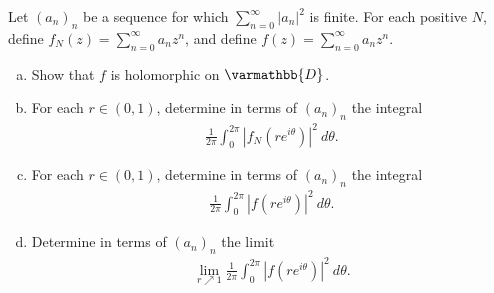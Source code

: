 \documentclass[10pt]{mypackage}
\renewcommand*{\mathbb}[1]{\varmathbb{#1}}
\begin{document}
\RaggedRight
\begin{problem}[Problem 1]
  Let $\left( a_n \right)_n$ be a sequence for which $\sum_{n=0}^{\infty}\left\vert a_n \right\vert^2$ is finite. For each positive $N$, define $f_N(z) = \sum_{n=0}^{\infty}a_nz^{n}$, and define $f(z) = \sum_{n=0}^{\infty}a_nz^{n}$.
  \begin{enumerate}[(a)]
    \item Show that $f$ is holomorphic on $ \mathbb{D} $.
    \item For each $r\in \left( 0,1 \right)$, determine in terms of $ \left( a_n \right)_n $ the integral
      \begin{align*}
        \frac{1}{2\pi} \int_{0}^{2\pi} \left\vert f_N\left( re^{i\theta} \right) \right\vert^2\:d\theta.
      \end{align*}
    \item For each $r\in \left( 0,1 \right)$, determine in terms of $ \left( a_n \right)_n $ the integral
      \begin{align*}
        \frac{1}{2\pi} \int_{0}^{2\pi} \left\vert f\left( re^{i\theta} \right) \right\vert^{2}\:d\theta.
      \end{align*}
    \item Determine in terms of $ \left( a_n \right)_n $ the limit
      \begin{align*}
        \lim_{r\nearrow 1} \frac{1}{2\pi} \int_{0}^{2\pi} \left\vert f\left( re^{i\theta} \right) \right\vert^2\:d\theta.
      \end{align*}
  \end{enumerate}
\end{problem}
\end{document}
